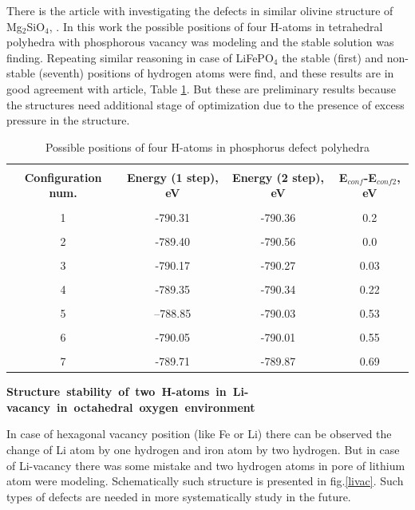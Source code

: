 There is the article with investigating the defects in similar olivine structure of Mg$_2$SiO$_4$, \cite{mineral}. In this work the possible positions of four H-atoms in tetrahedral polyhedra with phosphorous vacancy was modeling and the stable solution was finding. Repeating similar reasoning in case of LiFePO$_4$ the stable (first) and non-stable (seventh) positions of hydrogen atoms were find, and these results are in good agreement with article,  Table \ref{4H}. But these are preliminary results because the structures need additional stage of optimization due to the presence of excess pressure in the structure. 

\begin{table}[h]
\scriptsize{
\caption{Possible positions of four H-atoms in phosphorus defect polyhedra}
\label{4H}
\begin{center}
\begin{tabular}{|c|c|c|c|}
\hline
& & & \\
 \textbf{Configuration num.} & \textbf{Energy (1 step), eV} &  \textbf{Energy (2 step), eV} &  \textbf{E$_{conf}$-E$_{conf2}$, eV}\\ 
\hline
&  & & \\
1  & -790.31 & -790.36 & 0.2\\ 
\hline
&  & &\\
2  & -789.40 & -790.56 & 0.0\\
\hline
&  & &\\
3 & -790.17 & -790.27 & 0.03\\
\hline
&  & &\\
4 & -789.35 & -790.34 & 0.22\\
\hline
&  & &\\
5 & --788.85 & -790.03 & 0.53\\
\hline
&  & &\\
6 & -790.05 & -790.01 & 0.55\\
\hline
&  & &\\
7 & -789.71 & -789.87 & 0.69\\
\hline
\end{tabular}
\end{center}
}
\end{table}

\noindent\mbox{\textbf{Structure stability of two H-atoms in Li-vacancy in octahedral oxygen environment}}

In case of hexagonal vacancy position (like Fe or Li) there can be observed the change of Li atom by one hydrogen and iron atom by two hydrogen. But in case of Li-vacancy there was some mistake and two hydrogen atoms in pore of lithium atom were modeling. Schematically such structure is presented in fig.\ref{livac}. Such types of defects are needed in more systematically study in the future.

